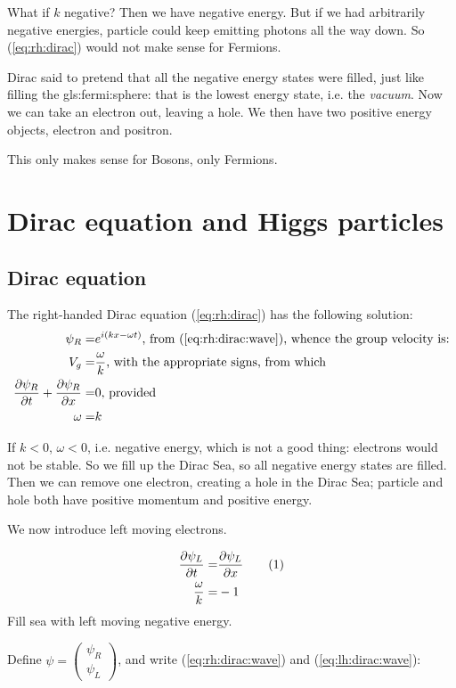 \documentclass[]{article}
\newcommand\numberthis{\addtocounter{equation}{1}\tag{\theequation}}
\begin{document}
What if $k$ negative? Then we have negative energy. But if we had arbitrarily negative energies, particle could keep emitting photons all the way down. So (\ref{eq:rh:dirac}) would not make sense for Fermions.

Dirac said to pretend that all the negative energy states were filled, just like filling the \gls{gls:fermi:sphere}: that is the lowest energy state, i.e. the \emph{vacuum}. Now we can take an electron out, leaving a hole. We then have two positive energy objects, electron and positron.

This only makes sense for Bosons, only Fermions.

\section{Dirac equation and Higgs particles}

\subsection{Dirac equation}

The right-handed Dirac equation (\ref{eq:rh:dirac}) has the following solution:
\begin{align*}
	\psi_R =& e^{i(kx-\omega t)} \text{, from (\ref{eq:rh:dirac:wave}), whence the group velocity is:}\\
	V_g =& \frac{\omega}{k} \text{, with the appropriate signs, from which}\\
	\frac{\partial \psi_R}{\partial t} + \frac{\partial \psi_R}{\partial x} =&0 \text{, provided}\\
	\omega =& k
\end{align*}

If $k<0$, $\omega<0$, i.e. negative energy, which is not a good thing: electrons would not be stable. So we fill up the Dirac Sea, so all negative energy states are filled. Then we can remove one electron, creating a hole in the Dirac Sea; particle and hole both have positive momentum and positive energy.

We now introduce left moving electrons.

\begin{align*}
	\frac{\partial \psi_L}{\partial t} =& \frac{\partial \psi_L}{\partial x} \numberthis \label{eq:lh:dirac:wave}\\
	\frac{\omega}{k} =& -1
\end{align*}
Fill sea with left moving negative energy.

Define $\psi=\begin{pmatrix}
	\psi_R\\
	\psi_L
\end{pmatrix}$, and write (\ref{eq:rh:dirac:wave}) and (\ref{eq:lh:dirac:wave}):
\end{document}

